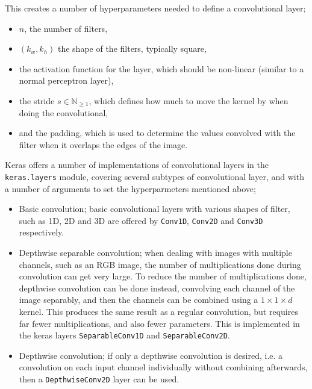 \documentclass[12pt,a4paper,titlepage,twoside]{report}
\begin{document}

	This creates a number of hyperparameters needed to define a convolutional layer;
	\begin{itemize}
	\item $n$, the number of filters,
	\item $(k_w, k_h)$ the shape of the filters, typically square,
	\item the activation function for the layer, which should be non-linear (similar to a normal perceptron layer),
	\item the stride $s \in \mathbb{N}_{\geq1}$, which defines how much to move the kernel by when doing the convolutional,
	\item and the padding, which is used to determine the values convolved with the filter when it overlaps the edges of the image.
	\end{itemize}
	Keras offers a number of implementations of convolutional layers in the \texttt{keras.layers} module, covering several subtypes of convolutional layer, and with a number of arguments to set the hyperparmeters mentioned above;
	\begin{itemize}
	\item Basic convolution; basic convolutional layers with various shapes of filter, such as 1D, 2D and 3D are offered by \texttt{Conv1D}, \texttt{Conv2D} and \texttt{Conv3D} respectively.
	\item Depthwise separable convolution; when dealing with images with multiple channels, such as an RGB image, the number of multiplications done during convolution can get very large. To reduce the number of multiplications done, depthwise convolution can be done instead, convolving each channel of the image separably, and then the channels can be combined using a $1 \times 1 \times d$ kernel. This produces the same result as a regular convolution, but requires far fewer multiplications, and also fewer parameters\cite{cnn-depth-conv}. This is implemented in the keras layers \texttt{SeparableConv1D} and \texttt{SeparableConv2D}.
	\item Depthwise convolution; if only a depthwise convolution is desired, i.e. a convolution on each input channel individually without combining afterwards, then a \texttt{DepthwiseConv2D} layer can be used.
	\end{itemize}
	
\end{document}
